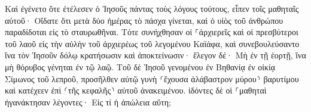 \documentclass{openreader}
\begin{document}
Καὶ ἐγένετο ὅτε ἐτέλεσεν ὁ Ἰησοῦς πάντας τοὺς λόγους τούτους, εἶπεν τοῖς μαθηταῖς αὐτοῦ· 
Οἴδατε ὅτι μετὰ δύο ἡμέρας τὸ πάσχα γίνεται, καὶ ὁ υἱὸς τοῦ ἀνθρώπου παραδίδοται εἰς τὸ σταυρωθῆναι. 
Τότε συνήχθησαν οἱ ⸀ἀρχιερεῖς καὶ οἱ πρεσβύτεροι τοῦ λαοῦ εἰς τὴν αὐλὴν τοῦ ἀρχιερέως τοῦ λεγομένου Καϊάφα, 
καὶ συνεβουλεύσαντο ἵνα τὸν Ἰησοῦν δόλῳ κρατήσωσιν καὶ ἀποκτείνωσιν· 
ἔλεγον δέ· Μὴ ἐν τῇ ἑορτῇ, ἵνα μὴ θόρυβος γένηται ἐν τῷ λαῷ. 
Τοῦ δὲ Ἰησοῦ γενομένου ἐν Βηθανίᾳ ἐν οἰκίᾳ Σίμωνος τοῦ λεπροῦ, 
προσῆλθεν αὐτῷ γυνὴ ⸂ἔχουσα ἀλάβαστρον μύρου⸃ βαρυτίμου καὶ κατέχεεν ἐπὶ ⸂τῆς κεφαλῆς⸃ αὐτοῦ ἀνακειμένου. 
ἰδόντες δὲ οἱ ⸀μαθηταὶ ἠγανάκτησαν λέγοντες· Εἰς τί ἡ ἀπώλεια αὕτη; 
\end{document}
